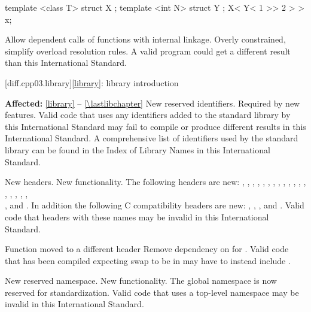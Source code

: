 \begin{codeblock}
template <class T> struct X { };
template <int N> struct Y { };
X< Y< 1 >> 2 > > x;
\end{codeblock}

\change
Allow dependent calls of functions with internal linkage.
\rationale
Overly constrained, simplify overload resolution rules.
\effect
A valid \CppIII{} program could get a different result than this
International Standard.

[diff.cpp03.library]{\ref{library}: library introduction}

\pnum
\textbf{Affected:} \ref{library} -- \ref{\lastlibchapter}
\change
New reserved identifiers.
\rationale
Required by new features.
\effect
Valid \CppIII{} code that uses any identifiers added to the \Cpp{} standard
library by this International Standard may fail to compile or produce different
results in this International Standard. A comprehensive list of identifiers used
by the \Cpp{} standard library can be found in the Index of Library Names in this
International Standard.

\change
New headers.
\rationale
New functionality.
\effect
The following \Cpp{} headers are new:
,
,
,
,
,
,
,
,
,
,
,
,
,
,
,
,
,
,\\
,
and
.
In addition the following C compatibility headers are new:
,
,
,
and
.
Valid \CppIII{} code that  headers with these names may be
invalid in this International Standard.

\effect
Function  moved to a different header
\rationale
Remove dependency on  for .
\effect
Valid \CppIII{} code that has been compiled expecting swap to be in
 may have to instead include .

\change
New reserved namespace.
\rationale
New functionality.
\effect
The global namespace  is now reserved for standardization. Valid
\CppIII{} code that uses a top-level namespace  may be invalid in
this International Standard.

